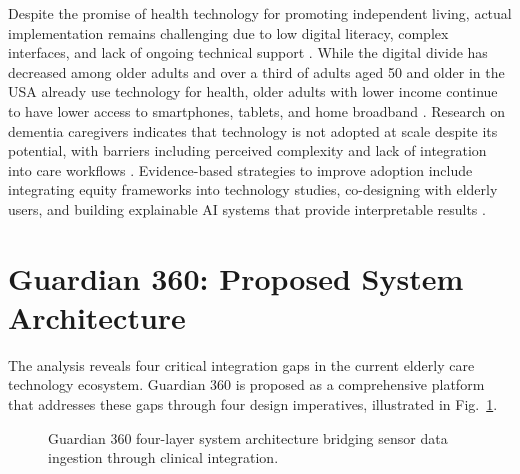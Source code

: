 \documentclass[conference]{IEEEtran}
\begin{document}
Despite the promise of health technology for promoting independent living, actual implementation remains challenging due to low digital literacy, complex interfaces, and lack of ongoing technical support \cite{pmc_barriers}. While the digital divide has decreased among older adults and over a third of adults aged 50 and older in the USA already use technology for health, older adults with lower income continue to have lower access to smartphones, tablets, and home broadband \cite{pmc_ethics}. Research on dementia caregivers indicates that technology is not adopted at scale despite its potential, with barriers including perceived complexity and lack of integration into care workflows \cite{pmc_dementia}. Evidence-based strategies to improve adoption include integrating equity frameworks into technology studies, co-designing with elderly users, and building explainable AI systems that provide interpretable results \cite{pmc_ethics}.

\section{Guardian 360: Proposed System Architecture}

The analysis reveals four critical integration gaps in the current elderly care technology ecosystem. Guardian 360 is proposed as a comprehensive platform that addresses these gaps through four design imperatives, illustrated in Fig.~\ref{fig:architecture}.

\begin{figure}[!t]
\centering
{}
\caption{Guardian 360 four-layer system architecture bridging sensor data ingestion through clinical integration.}
\label{fig:architecture}
\end{figure}
\end{document}
